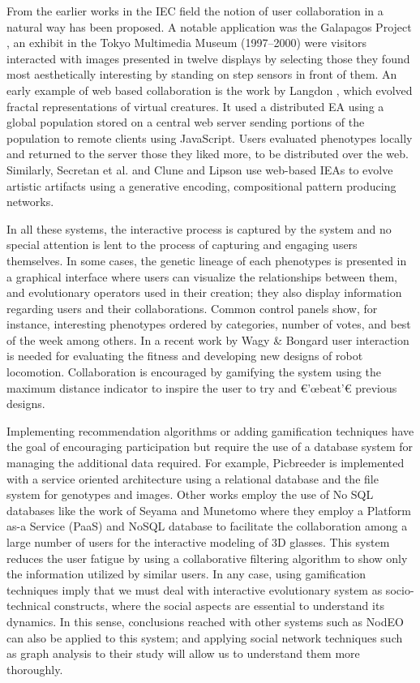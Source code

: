 \documentclass[conference]{IEEEtran}
\begin{document}
From the earlier works in the IEC field the notion of user collaboration in a natural way
has been proposed. A notable application was the Galapagos Project \cite{sims1997interactivity},
an exhibit in the Tokyo Multimedia Museum (1997--2000) were visitors interacted with images presented in 
twelve displays by selecting those they found most aesthetically interesting by standing on
step sensors in front of them. An early example of web based collaboration is the work by 
Langdon \cite{langdon:2004}, which evolved fractal representations of virtual creatures. It used a 
distributed EA using a global population stored on a central web server sending 
portions of the population to remote clients using JavaScript. Users evaluated phenotypes locally 
and returned to the server those they liked more, to be distributed over the web.
Similarly, Secretan et al. \cite{picbreeder} and Clune and Lipson \cite{forms} use web-based IEAs 
to evolve artistic artifacts using a generative encoding, compositional pattern producing networks.

In all these systems, the interactive process is captured by the
system and no special attention is lent to the process of capturing
and engaging users themselves. In some cases, the genetic lineage of each
phenotypes is presented in a graphical interface 
where users can visualize the relationships between them, and evolutionary operators used in
their creation; they also display information regarding users and
their collaborations.  Common control panels  show, for instance,  
interesting phenotypes ordered by categories, number of votes, and
best of the week among others. In a recent work by 
Wagy \& Bongard \cite{wagy2014collective} user interaction is needed for evaluating the fitness and developing
new designs of robot locomotion. Collaboration is encouraged by gamifying the system 
using the maximum distance indicator to inspire the user to try and €'œbeat'€ previous designs. 

Implementing recommendation algorithms or adding gamification techniques have the goal of encouraging participation 
but require the use of a database system for managing the additional data required. 
For example, Picbreeder \cite{picbreeder} is implemented with a service oriented
architecture using a relational database and the file system for genotypes and images. Other works employ the 
use of No SQL databases like the work of Seyama and Munetomo \cite{seyama2016development} where they
employ a Platform as-a Service (PaaS) and NoSQL database to facilitate the collaboration 
among a large number of users for the interactive modeling of 3D glasses.  This system reduces the user fatigue
by using a collaborative filtering algorithm to show only the
information utilized by similar users. In any case, using gamification
techniques imply that we must deal with interactive evolutionary
system as socio-technical constructs, where the social aspects are
essential to understand its dynamics. In this sense, conclusions
reached with other systems such as NodEO
\cite{DBLP:conf/gecco/MereloCGCRV16} can also be applied to this
system; and applying social network techniques such as graph analysis
to their study will allow us to understand them more thoroughly. 
\end{document}
